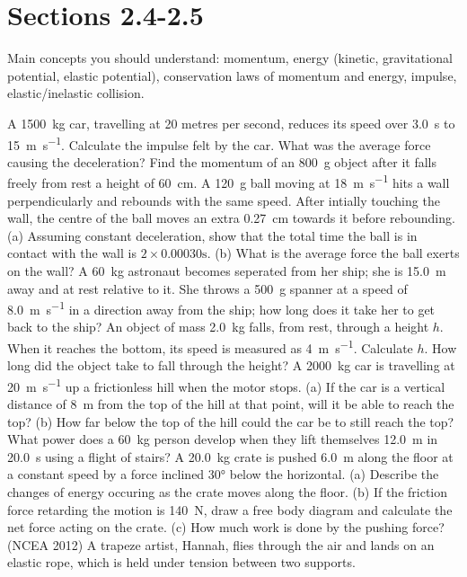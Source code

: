 \documentclass[a4paper]{exam}
\begin{document}
  \section*{Sections 2.4-2.5}
  Main concepts you should understand: momentum, energy (kinetic, gravitational potential, elastic potential), conservation laws of momentum and energy,
  impulse, elastic/inelastic collision.
  \begin{questions}
    \question A \SI{1500}{\kilo\gram} car, travelling at 20 metres per second, reduces its speed over \SI{3.0}{\second}
              to \SI{15}{\metre\per\second}. Calculate the impulse felt by the car. What was the average force causing the deceleration?
    \question Find the momentum of an \SI{800}{\gram} object after it falls freely from rest a height of \SI{60}{\centi\metre}.
    \question A \SI{120}{\gram} ball moving at \SI{18}{\metre\per\second} hits a wall perpendicularly and rebounds with the same
              speed. After intially touching the wall, the centre of the ball moves an extra \SI{0.27}{\centi\metre} towards it
              before rebounding. (a) Assuming constant deceleration, show that the total time the ball is in contact with the
              wall is $ 2 \times 0.00030 \si{\second} $. (b) What is the average force the ball exerts on the wall?
    \question A \SI{60}{\kilo\gram} astronaut becomes seperated from her ship; she is \SI{15.0}{\metre} away and at rest
              relative to it. She throws a \SI{500}{\gram} spanner at a speed of \SI{8.0}{\metre\per\second} in a direction
              away from the ship; how long does it take her to get back to the ship?
    \question An object of mass \SI{2.0}{\kilo\gram} falls, from rest, through a height $ h $. When it reaches the bottom, its
              speed is measured as \SI{4}{\metre\per\second}. Calculate $ h $. How long did the object take to fall through the height?
    \question A \SI{2000}{\kilo\gram} car is travelling at \SI{20}{\metre\per\second} up a frictionless hill when the motor stops. (a) If the car
              is a vertical distance of \SI{8}{\metre} from the top of the hill at that point, will it be able to reach the top? (b) How far below
              the top of the hill could the car be to still reach the top?
    \question What power does a \SI{60}{\kilo\gram} person develop when they lift themselves \SI{12.0}{\metre} in \SI{20.0}{\second} using
              a flight of stairs?
    \question A \SI{20.0}{\kilo\gram} crate is pushed \SI{6.0}{\metre} along the floor at a constant speed by a force
              inclined \ang{30} below the horizontal. (a) Describe the changes of energy occuring as the crate
              moves along the floor. (b) If the friction force retarding the motion is \SI{140}{\newton},
              draw a free body diagram and calculate the net force acting on the crate. (c) How much work is done by
              the pushing force?
    \question (NCEA 2012) A trapeze artist, Hannah, flies through the air and lands on an elastic rope, which is held
              under tension between two supports.
      \begin{parts}

\end{parts}
\end{questions}
\end{document}
